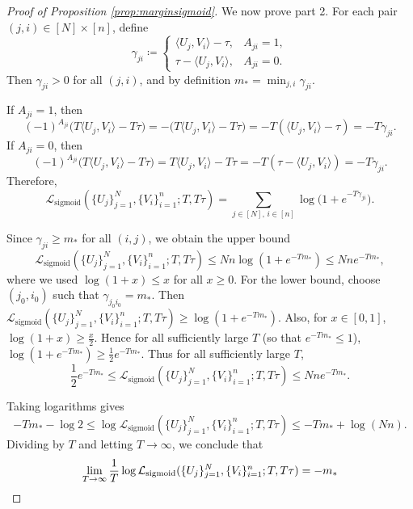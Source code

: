 \documentclass[10pt,a4paper]{amsart}
\newcommand{\sigloss}{\mathcal{L}_{\text{sigmoid}}}
\begin{document}
\begin{proof}[Proof of Proposition \ref{prop:marginsigmoid}]
We now prove part 2. For each pair $(j,i) \in [N] \times [n]$, define
$$
\gamma_{ji}\coloneqq
\begin{cases}
\langle U_j,V_i\rangle-\tau, & A_{ji}=1,\\[4pt]
\tau-\langle U_j,V_i\rangle, & A_{ji}=0.
\end{cases}
$$
Then $\gamma_{ji}>0$ for all $(j,i)$, and by definition $m_*=\min_{j,i}\gamma_{ji}$.

If $A_{ji}=1$, then
$$
(-1)^{A_{ji}}\bigl(T\langle U_j,V_i\rangle-T\tau\bigr)
=
-\bigl(T\langle U_j,V_i\rangle-T\tau\bigr)
=
-T(\langle U_j,V_i\rangle-\tau)
=
-T\gamma_{ji}.
$$
If $A_{ji}=0$, then
$$
(-1)^{A_{ji}}\bigl(T\langle U_j,V_i\rangle-T\tau\bigr)
=
T\langle U_j,V_i\rangle-T\tau
=
-T(\tau-\langle U_j,V_i\rangle)
=
-T\gamma_{ji}.
$$
Therefore,
$$
\sigloss(\{U_j\}_{j=1}^N,\{V_i\}_{i=1}^n;T,T\tau)
=
\sum_{j\in[N],\,i\in[n]}\log\!\bigl(1+e^{-T\gamma_{ji}}\bigr).
$$

Since $\gamma_{ji}\ge m_*$ for all $(i,j)$, we obtain the upper bound
$$\sigloss(\{U_j\}_{j = 1}^N,\{V_i\}_{i = 1}^n;T,T\tau)
\leq
Nn\log(1+e^{-Tm_*})
\leq
Nne^{-Tm_*},
$$
where we used $\log(1+x)\le x$ for all $x\ge0$. For the lower bound, choose $(j_0,i_0)$ such that $\gamma_{j_0i_0}=m_*$. Then $\sigloss(\{U_j\}_{j=1}^N,\{V_i\}_{i = 1}^n;T,T\tau)
\ge
\log(1+e^{-Tm_*})$. Also, for $x\in[0,1]$, $\log(1+x)\ge \frac{x}{2}$. Hence for all sufficiently large $T$ (so that $e^{-Tm_*}\le1$), $\log(1+e^{-Tm_*})\ge \frac12 e^{-Tm_*}$. Thus for all sufficiently large $T$,
$$
\frac{1}{2} e^{-Tm_*}
\leq
\sigloss(\{U_j\}_{j = 1}^N,\{V_i\}_{i = 1}^n;T,T\tau)
\le
Nne^{-Tm_*}.
$$

Taking logarithms gives
$$
-Tm_*-\log 2
\le
\log \sigloss(\{U_j\}_{j = 1}^N,\{V_i\}_{i = 1}^n;T,T\tau)
\le
-Tm_*+\log(Nn).
$$
Dividing by $T$ and letting $T\to\infty$, we conclude that
$$
\lim_{T\to\infty}
\frac{1}{T}\log \sigloss(\{U_j\}_{j = 1}^N,\{V_i\}_{i = 1}^n;T,T\tau)
=
-m_*\qedhere
$$
\end{proof}
\end{document}
